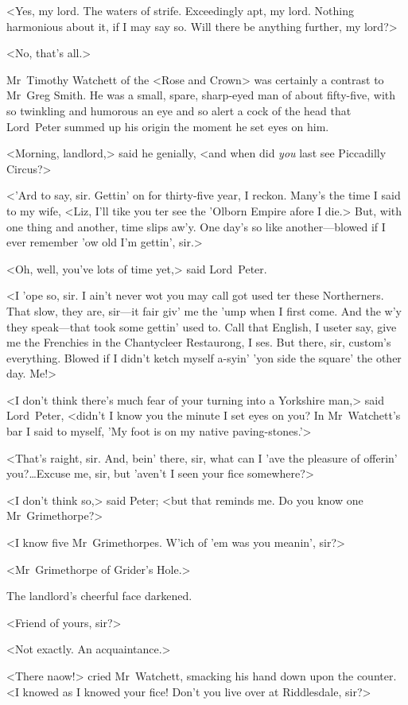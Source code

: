 <Yes, my lord. The waters of strife. Exceedingly apt, my lord. Nothing harmonious about it, if I may say so. Will there be anything further, my lord?>

<No, that's all.>

Mr~Timothy Watchett of the <Rose and Crown> was certainly a contrast to Mr~Greg Smith. He was a small, spare, sharp-eyed man of about fifty-five, with so twinkling and humorous an eye and so alert a cock of the head that Lord~Peter summed up his origin the moment he set eyes on him.

<Morning, landlord,> said he genially, <and when did \emph{you} last see Piccadilly Circus?>

<'Ard to say, sir. Gettin' on for thirty-five year, I reckon. Many's the time I said to my wife, <Liz, I'll tike you ter see the 'Olborn Empire afore I die.> But, with one thing and another, time slips aw'y. One day's so like another—blowed if I ever remember 'ow old I'm gettin', sir.>

<Oh, well, you've lots of time yet,> said Lord~Peter.

<I 'ope so, sir. I ain't never wot you may call got used ter these Northerners. That slow, they are, sir—it fair giv' me the 'ump when I first come. And the w'y they speak—that took some gettin' used to. Call that English, I useter say, give me the Frenchies in the Chantycleer Restaurong, I ses. But there, sir, custom's everything. Blowed if I didn't ketch myself a-syin' 'yon side the square' the other day. Me!>

<I don't think there's much fear of your turning into a Yorkshire man,> said Lord~Peter, <didn't I know you the minute I set eyes on you? In Mr~Watchett's bar I said to myself, 'My foot is on my native paving-stones.'>

<That's raight, sir. And, bein' there, sir, what can I 'ave the pleasure of offerin' you?\dots Excuse me, sir, but 'aven't I seen your fice somewhere?>

<I don't think so,> said Peter; <but that reminds me. Do you know one Mr~Grimethorpe?>

<I know five Mr~Grimethorpes. W'ich of 'em was you meanin', sir?>

<Mr~Grimethorpe of Grider's Hole.>

The landlord's cheerful face darkened.

<Friend of yours, sir?>

<Not exactly. An acquaintance.>

<There naow!> cried Mr~Watchett, smacking his hand down upon the counter. <I knowed as I knowed your fice! Don't you live over at Riddlesdale, sir?>

